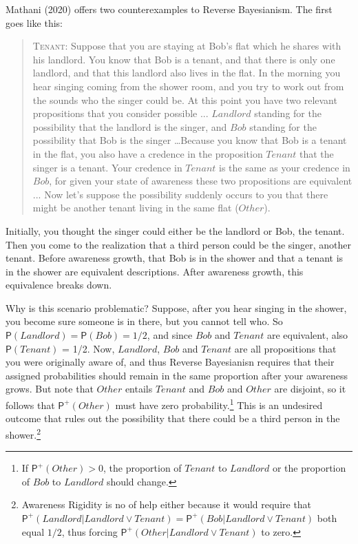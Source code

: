 \documentclass[
  11pt,
  dvipsnames,enabledeprecatedfontcommands]{scrartcl}
\newcommand{\pr}[1]{\ensuremath{\mathsf{P}(#1)}}
\newcommand{\ppr}[2]{\ensuremath{\mathsf{P}^{#1}(#2)}}
\begin{document}
\label{sec:mathani}

Mathani (2020) offers two counterexamples to Reverse Bayesianism. The
first goes like this:

\begin{quote}
\textsc{Tenant}: Suppose that you are staying at Bob's flat which he shares with his landlord. You know
that Bob is a tenant, and that there is only one landlord, and that this landlord also
lives in the flat. In the morning you hear singing coming from the shower room, and
you try to work out from the sounds who the singer could be. At this point you have
two relevant propositions that you consider possible ... $Landlord$ standing for the possibility that the landlord is the singer, and $Bob$ standing for the possibility that Bob is the singer  \dots  Because you know that Bob is a tenant in the flat, you also have a credence in the proposition $Tenant$ that the singer is a tenant. Your credence in $Tenant$ is the same as your credence in $Bob$, for given your state of awareness these two propositions are equivalent ... Now let's suppose the possibility suddenly occurs to you that there might be another tenant living in the same flat  ($Other$).
\end{quote}

\doublespace

\noindent Initially, you thought the singer could either be the landlord
or Bob, the tenant. Then you come to the realization that a third person
could be the singer, another tenant. Before awareness growth, that Bob
is in the shower and that a tenant is in the shower are equivalent
descriptions. After awareness growth, this equivalence breaks down.

Why is this scenario problematic? Suppose, after you hear singing in the
shower, you become sure someone is in there, but you cannot tell who. So
\(\pr{Landlord} = \pr{Bob} = 1/2\), and since \(Bob\) and \(Tenant\) are
equivalent, also \(\pr{Tenant}\) = 1/2. Now, \(Landlord\), \(Bob\) and
\(Tenant\) are all propositions that you were originally aware of, and
thus Reverse Bayesianisn requires that their assigned probabilities
should remain in the same proportion after your awareness grows. But
note that \(Other\) entails \(Tenant\) and \(Bob\) and \(Other\) are
disjoint, so it follows that \(\ppr{+}{Other}\) must have zero
probability.\footnote{If \(\ppr{+}{Other}>0\), the proportion of
  \(Tenant\) to \(Landlord\) or the proportion of \(Bob\) to
  \(Landlord\) should change.} This is an undesired outcome that rules
out the possibility that there could be a third person in the
shower.\footnote{Awareness Rigidity is no of help either because it
  would require that
  \(\ppr{+}{Landlord \vert Landlord \vee Tenant}=\ppr{+}{Bob \vert Landlord \vee Tenant}\)
  both equal \(1/2\), thus forcing
  \(\ppr{+}{Other \vert Landlord \vee Tenant}\) to zero.}
\end{document}

